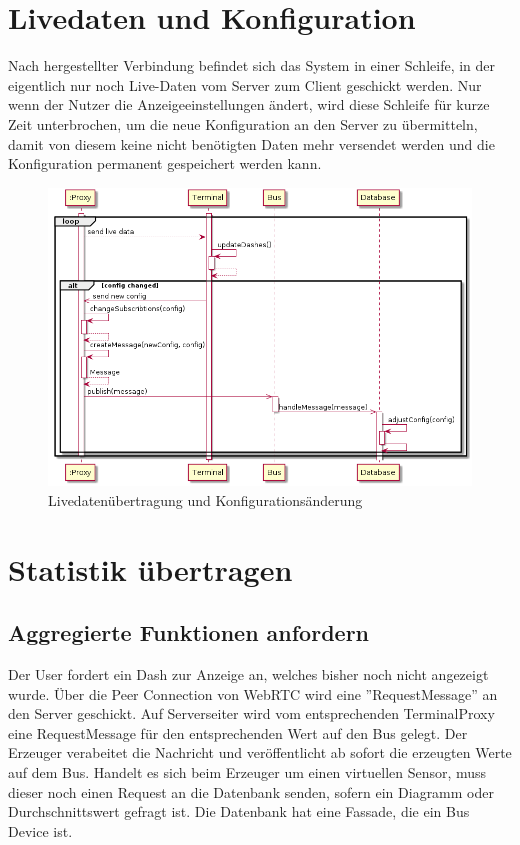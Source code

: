 \documentclass[entwurf.tex]{subfiles}
\begin{document}
  	\section{Livedaten und Konfiguration}
  	\label{Sequence:LiveDataNewConfig}
  		Nach hergestellter Verbindung befindet sich das System in einer Schleife, in der eigentlich nur noch Live-Daten vom Server zum Client geschickt werden. Nur wenn der Nutzer die Anzeigeeinstellungen ändert, wird diese Schleife für kurze Zeit unterbrochen, um die neue Konfiguration an den Server zu übermitteln, damit von diesem keine nicht benötigten Daten mehr versendet werden und die Konfiguration permanent gespeichert werden kann.
  		\begin{figure}[H]
  			\begin{center}
 				\includegraphics[width=\textwidth]{diagrams/ChangeDashConfig.png}
  				\caption{Livedatenübertragung und Konfigurationsänderung}
  			\end{center}
  		\end{figure}
  		
  	\section{Statistik übertragen}
  		\subsection{Aggregierte Funktionen anfordern} \label{vsseq}

      Der User fordert ein Dash zur Anzeige an, welches bisher noch nicht angezeigt wurde. Über die Peer Connection von WebRTC wird eine ''RequestMessage'' an den Server geschickt. Auf Serverseiter wird vom entsprechenden TerminalProxy eine RequestMessage für den entsprechenden Wert auf den Bus gelegt. Der Erzeuger verabeitet die Nachricht und veröffentlicht ab sofort die erzeugten Werte auf dem Bus. Handelt es sich beim Erzeuger um einen virtuellen Sensor, muss dieser noch einen Request an die Datenbank senden, sofern ein Diagramm oder Durchschnittswert gefragt ist. Die Datenbank hat eine Fassade, die ein Bus Device ist.
\end{document}
